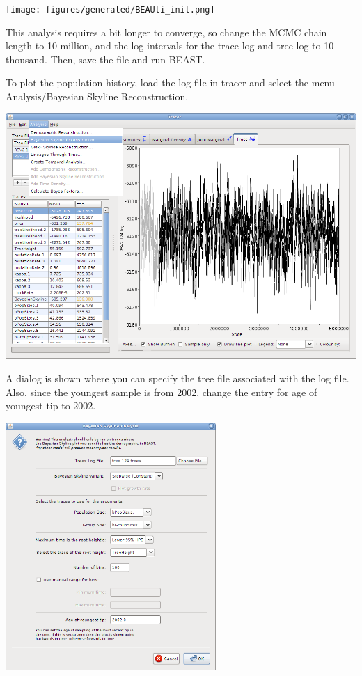 \documentclass[12pt]{article}
\begin{document}
\begin{center}
\texttt{[image: figures/generated/BEAUti\_init.png]}
\end{center}


This analysis requires a bit longer to converge, so change the MCMC chain length to 10 million,
and the log intervals for the trace-log and tree-log to 10 thousand. 
Then, save the file and run BEAST.


To plot the population history, load the log file in tracer and select the menu 
Analysis/Bayesian Skyline Reconstruction.

\includegraphics[scale=0.5,clip=true,trim=0 300 0 0]{figures/tracerBSP1.png}

A dialog is shown where you can specify the tree file associated with the log file.
Also, since the youngest sample is from 2002, change the entry for age of youngest
tip to 2002.

\begin{center}
\includegraphics[width=0.6\textwidth]{figures/tracerBSP2.png}
\end{center}
\end{document}
